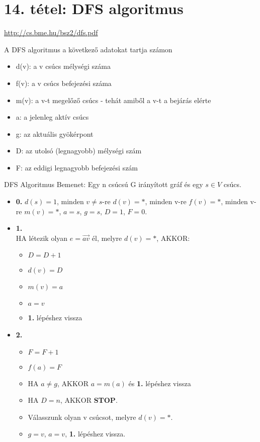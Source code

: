 \section{14. tétel: DFS algoritmus}

\url{http://cs.bme.hu/bsz2/dfs.pdf}

\begin{tetel}{A DFS algoritmus a következő adatokat tartja számon}
\begin{itemize}
\item d(v): a v csúcs mélységi száma
\item f(v): a v csúcs befejezési száma
\item m(v): a v-t megelőző csúcs - tehát amiből a v-t a bejárás elérte
\item a: a jelenleg aktív csúcs
\item g: az aktuális gyökérpont
\item D: az utolsó (legnagyobb) mélységi szám
\item F: az eddigi legnagyobb befejezési szám
\end{itemize}
\end{tetel}

\begin{tetel}{DFS Algoritmus}
Bemenet: Egy n csúcsú G irányított gráf és egy $s \in V$ csúcs.
\begin{itemize}
\item{\textbf{0.}} $d(s) = 1$, minden $v \neq s$-re $d(v) = *$, minden v-re $f(v) = *$, minden v-re $m(v) = *$, $a = s$, $g = s$, $D = 1$, $F = 0$.
\item{\textbf{1.}}
\\
HA létezik olyan $e = \overrightarrow{av}$ él, melyre $d(v) = *$, AKKOR:
	\begin{itemize}
	\item $D = D + 1$
	\item $d(v) = D$
	\item $m(v) = a$
	\item $a = v$
	\item \textbf{1.} lépéshez vissza
	\end{itemize}
\item{\textbf{2.}}
	\begin{itemize}
	\item $F = F + 1$
	\item $f(a) = F$
	\item HA $a \neq g$, AKKOR $a = m(a)$ és \textbf{1.} lépéshez vissza
	\item HA $D = n$, AKKOR \textbf{STOP}.
	\item Válasszunk olyan v csúcsot, melyre $d(v) = *$.
	\item $g = v$, $a = v$, \textbf{1.} lépéshez vissza.
	\end{itemize}
\end{itemize}
\end{tetel}

